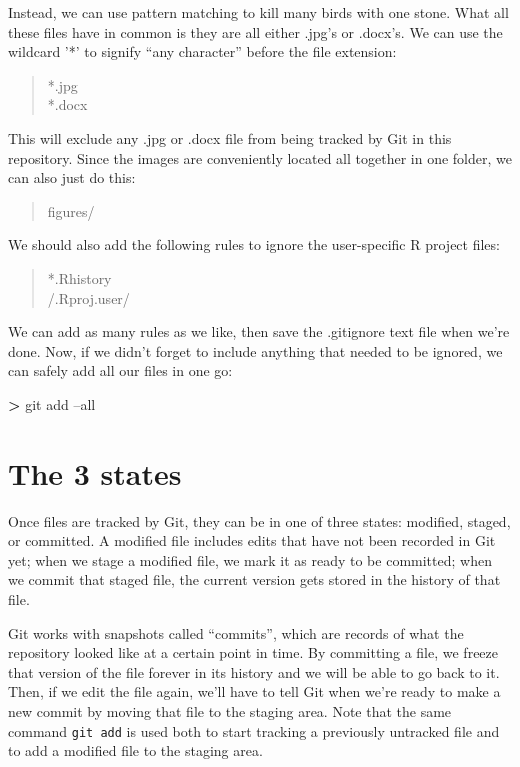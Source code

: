 \documentclass[
]{book}
\newenvironment{Shaded}{\begin{snugshade}}{\end{snugshade}}
\newcommand{\FunctionTok}[1]{\textcolor[rgb]{0.00,0.00,0.00}{#1}}
\newcommand{\NormalTok}[1]{#1}
\newcommand{\OperatorTok}[1]{\textcolor[rgb]{0.81,0.36,0.00}{\textbf{#1}}}
\begin{document}
Instead, we can use pattern matching to kill many birds with one stone. What all these files have in common is they are all either .jpg's or .docx's. We can use the wildcard '*' to signify ``any character'' before the file extension:

\begin{quote}
*.jpg\\
*.docx
\end{quote}

This will exclude any .jpg or .docx file from being tracked by Git in this repository. Since the images are conveniently located all together in one folder, we can also just do this:

\begin{quote}
figures/
\end{quote}

We should also add the following rules to ignore the user-specific R project files:

\begin{quote}
*.Rhistory\\
/.Rproj.user/
\end{quote}

We can add as many rules as we like, then save the .gitignore text file when we're done. Now, if we didn't forget to include anything that needed to be ignored, we can safely add all our files in one go:

\begin{Shaded}
\begin{Highlighting}[]
\OperatorTok{>} \FunctionTok{git}\NormalTok{ add --all}
\end{Highlighting}
\end{Shaded}

\hypertarget{the-3-states}{%
\section{The 3 states}\label{the-3-states}}

Once files are tracked by Git, they can be in one of three states: modified, staged, or committed. A modified file includes edits that have not been recorded in Git yet; when we stage a modified file, we mark it as ready to be committed; when we commit that staged file, the current version gets stored in the history of that file.

Git works with snapshots called ``commits'', which are records of what the repository looked like at a certain point in time. By committing a file, we freeze that version of the file forever in its history and we will be able to go back to it. Then, if we edit the file again, we'll have to tell Git when we're ready to make a new commit by moving that file to the staging area. Note that the same command \texttt{git\ add} is used both to start tracking a previously untracked file and to add a modified file to the staging area.
\end{document}
